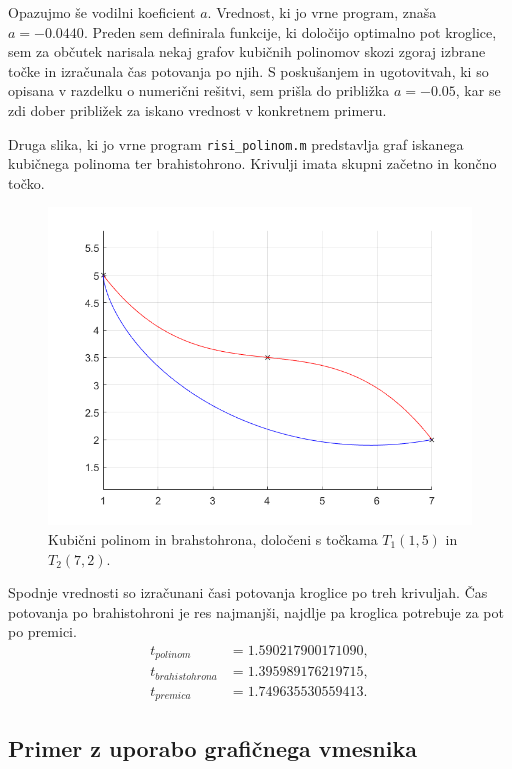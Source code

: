 \documentclass[a4paper]{article}
\begin{document}
Opazujmo še vodilni koeficient $a$. Vrednost, ki jo vrne program, znaša $a = -0.0440$. Preden sem definirala funkcije, ki določijo optimalno pot kroglice, sem za občutek narisala nekaj grafov kubičnih polinomov skozi zgoraj izbrane točke in izračunala čas potovanja po njih. S poskušanjem in ugotovitvah, ki so opisana v razdelku o numerični rešitvi, sem prišla do približka $a = -0.05$, kar se zdi dober približek za iskano vrednost v konkretnem primeru. 

Druga slika, ki jo vrne program \texttt{risi\_polinom.m} predstavlja graf iskanega kubičnega polinoma ter brahistohrono. Krivulji imata skupni začetno in končno točko. 
%
\begin{figure}[h!]
\begin{center}
\includegraphics[scale=0.6]{primer2-PolBrah.png}
\caption{Kubični polinom in brahstohrona, določeni s točkama $T_1(1,5)$ in $T_2(7,2)$.}
\end{center}
\end{figure}
%

Spodnje vrednosti so izračunani časi potovanja kroglice po treh krivuljah. Čas potovanja po brahistohroni je res najmanjši, najdlje pa kroglica potrebuje za pot po premici.
%
\begin{align*}
t_{polinom} &= 1.590217900171090, \\
t_{brahistohrona} &= 1.395989176219715, \\
t_{premica} &= 1.749635530559413.
\end{align*}

\subsection{Primer z uporabo grafičnega vmesnika}
\end{document}
